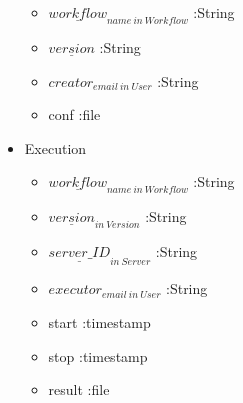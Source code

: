 \begin{itemize}
\begin{itemize}
		\item $\underline{workflow}_{name\:in\:Workflow}$ :String
		\item $\underline{version}$ :String
		\item $creator_{email\:in\:User}$ :String
		\item conf :file
	\end{itemize}
	\item Execution
	\begin{itemize}
		\item $\underline{workflow}_{name\:in\:Workflow}$ :String
		\item $\underline{version}_{in\:Version}$ :String
		\item $\underline{server\_ID}_{in\:Server}$ :String
		\item $executor_{email\:in\:User}$ :String
		\item start :timestamp
		\item stop :timestamp
		\item result :file
	\end{itemize}
\end{itemize}






\newpage